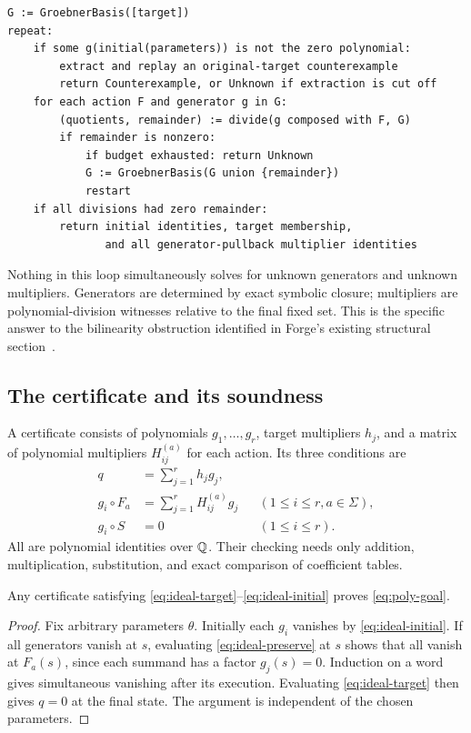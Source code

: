 \begin{lstlisting}
G := GroebnerBasis([target])
repeat:
    if some g(initial(parameters)) is not the zero polynomial:
        extract and replay an original-target counterexample
        return Counterexample, or Unknown if extraction is cut off
    for each action F and generator g in G:
        (quotients, remainder) := divide(g composed with F, G)
        if remainder is nonzero:
            if budget exhausted: return Unknown
            G := GroebnerBasis(G union {remainder})
            restart
    if all divisions had zero remainder:
        return initial identities, target membership,
               and all generator-pullback multiplier identities
\end{lstlisting}

Nothing in this loop simultaneously solves for unknown generators and unknown
multipliers. Generators are determined by exact symbolic closure; multipliers
are polynomial-division witnesses relative to the final fixed set. This is the
specific answer to the bilinearity obstruction identified in Forge's existing
structural section~\cite{forge-structural}.

\subsection{The certificate and its soundness}

A certificate consists of polynomials $g_1,\ldots,g_r$, target multipliers $h_j$,
and a matrix of polynomial multipliers $H^{(a)}_{ij}$ for each action. Its three
conditions are
\begin{align}
 q&=\sum_{j=1}^r h_jg_j,\label{eq:ideal-target}\\
 g_i\circ F_a&=\sum_{j=1}^r H^{(a)}_{ij}g_j
 &&(1\le i\le r,
 a\in\Sigma),\label{eq:ideal-preserve}\\
 g_i\circ S&=0 &&(1\le i\le r).
 \label{eq:ideal-initial}
\end{align}
All are polynomial identities over $\mathbb Q$. Their checking needs only addition,
multiplication, substitution, and exact comparison of coefficient tables.

\begin{theorem}\label{thm:ideal-sound}
Any certificate satisfying \eqref{eq:ideal-target}--\eqref{eq:ideal-initial}
proves \eqref{eq:poly-goal}.
\end{theorem}
\begin{proof}
Fix arbitrary parameters $\theta$. Initially each $g_i$ vanishes by
\eqref{eq:ideal-initial}. If all generators vanish at $s$, evaluating
\eqref{eq:ideal-preserve} at $s$ shows that all vanish at $F_a(s)$, since each
summand has a factor $g_j(s)=0$. Induction on a word gives simultaneous
vanishing after its execution. Evaluating \eqref{eq:ideal-target} then gives
$q=0$ at the final state. The argument is independent of the chosen parameters.
\end{proof}

